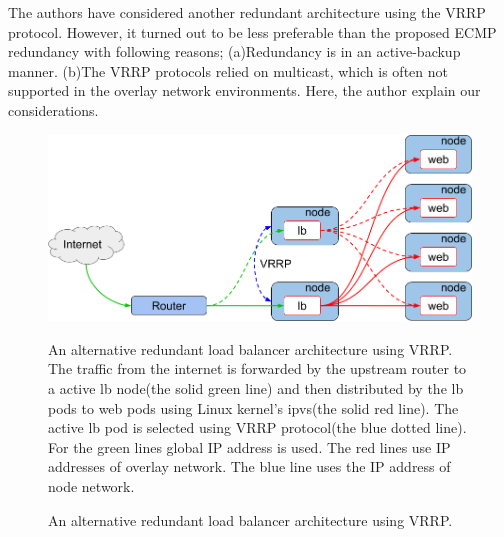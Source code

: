 The authors have considered another redundant architecture using the VRRP protocol.
However, it turned out to be less preferable than the proposed ECMP redundancy with following reasons;
(a)Redundancy is in an active-backup manner.
(b)The VRRP protocols relied on multicast, which is often not supported in the overlay network environments.
Here, the author explain our considerations.

\begin{figure}[h]
\begin{center}
\includegraphics[width=0.9\columnwidth]{Figs/vrrp.png}
\end{center}

\par\bigskip
\centering
\begin{minipage}{0.9\columnwidth}
  \caption[An alternative redundant load balancer architecture using VRRP]{
    An alternative redundant load balancer architecture using VRRP.
    The traffic from the internet is forwarded by the upstream router to a active lb node(the solid green line) and then distributed by the lb pods to web pods using Linux kernel's ipvs(the solid red line).
    The active lb pod is selected using VRRP protocol(the blue dotted line).
    For the green lines global IP address is used. The red lines use IP addresses of overlay network.
    The blue line uses the IP address of node network.
  }
  \label{fig:vrrp}
\end{minipage}

\caption{ An alternative redundant load balancer architecture using VRRP.}

\end{figure}

